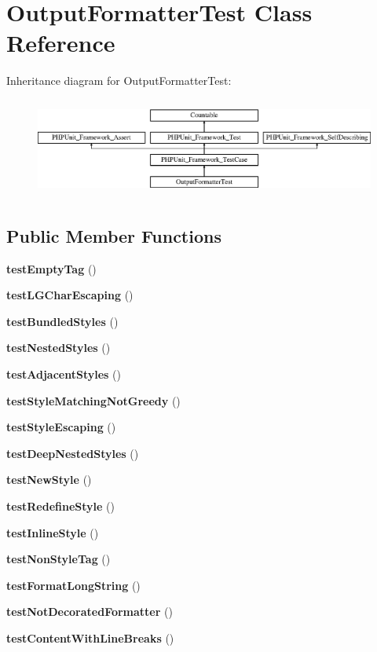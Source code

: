 \section{Output\+Formatter\+Test Class Reference}
\label{class_symfony_1_1_component_1_1_console_1_1_tests_1_1_formatter_1_1_output_formatter_test}
Inheritance diagram for Output\+Formatter\+Test\+:\begin{figure}[H]
\begin{center}
\leavevmode
\includegraphics[height=3.303835cm]{class_symfony_1_1_component_1_1_console_1_1_tests_1_1_formatter_1_1_output_formatter_test}
\end{center}
\end{figure}
\subsection*{Public Member Functions}
\begin{DoxyCompactItemize}
\item 
{\bf test\+Empty\+Tag} ()
\item 
{\bf test\+L\+G\+Char\+Escaping} ()
\item 
{\bf test\+Bundled\+Styles} ()
\item 
{\bf test\+Nested\+Styles} ()
\item 
{\bf test\+Adjacent\+Styles} ()
\item 
{\bf test\+Style\+Matching\+Not\+Greedy} ()
\item 
{\bf test\+Style\+Escaping} ()
\item 
{\bf test\+Deep\+Nested\+Styles} ()
\item 
{\bf test\+New\+Style} ()
\item 
{\bf test\+Redefine\+Style} ()
\item 
{\bf test\+Inline\+Style} ()
\item 
{\bf test\+Non\+Style\+Tag} ()
\item 
{\bf test\+Format\+Long\+String} ()
\item 
{\bf test\+Not\+Decorated\+Formatter} ()
\item 
{\bf test\+Content\+With\+Line\+Breaks} ()
\end{DoxyCompactItemize}
